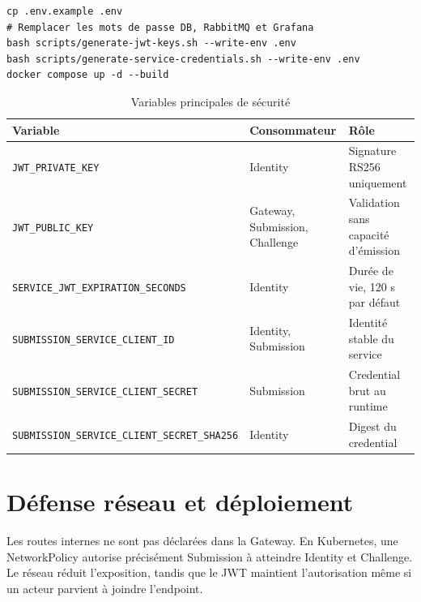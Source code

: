 \documentclass[12pt,a4paper,oneside]{report}
\newcommand{\code}[1]{\texttt{#1}}
\begin{document}
\begin{lstlisting}[caption={Initialisation locale sécurisée},label={lst:local-setup}]
cp .env.example .env
# Remplacer les mots de passe DB, RabbitMQ et Grafana
bash scripts/generate-jwt-keys.sh --write-env .env
bash scripts/generate-service-credentials.sh --write-env .env
docker compose up -d --build
\end{lstlisting}

\begin{table}[H]
\centering
\caption{Variables principales de sécurité}
\label{tab:variables}
\small
\begin{tabularx}{\textwidth}{P{5.0cm}P{2.7cm}Y}
\toprule
\textbf{Variable} & \textbf{Consommateur} & \textbf{Rôle} \\
\midrule
\code{JWT\_PRIVATE\_KEY} & Identity & Signature RS256 uniquement \\
\code{JWT\_PUBLIC\_KEY} & Gateway, Submission, Challenge & Validation sans capacité d'émission \\
\nolinkurl{SERVICE_JWT_EXPIRATION_SECONDS} & Identity & Durée de vie, 120 s par défaut \\
\nolinkurl{SUBMISSION_SERVICE_CLIENT_ID} & Identity, Submission & Identité stable du service \\
\nolinkurl{SUBMISSION_SERVICE_CLIENT_SECRET} & Submission & Credential brut au runtime \\
\nolinkurl{SUBMISSION_SERVICE_CLIENT_SECRET_SHA256} & Identity & Digest du credential \\
\bottomrule
\end{tabularx}
\end{table}

\section{Défense réseau et déploiement}
Les routes internes ne sont pas déclarées dans la Gateway. En Kubernetes, une
NetworkPolicy autorise précisément Submission à atteindre Identity et Challenge.
Le réseau réduit l'exposition, tandis que le JWT maintient l'autorisation même si
un acteur parvient à joindre l'endpoint.
\end{document}
